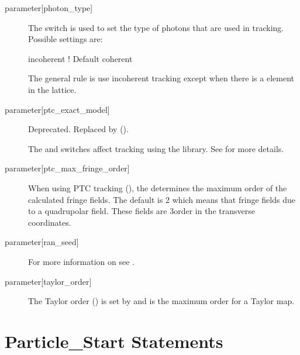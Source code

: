 \begin{description}
%
  \item[{parameter[photon_type]}] \Newline
The  switch is used to set the type of photons that are used in tracking. Possible
settings are:
\begin{example}
  incoherent    ! Default
  coherent 
\end{example}
The general rule is use incoherent tracking except when there is a  element in
the lattice.
%
  \item[{parameter[ptc_exact_model]}] \Newline
Deprecated. Replaced by  ().

The  and  switches affect tracking using the 
library. See  for more details.
%
  \item[{parameter[ptc_max_fringe_order]}] \Newline
When using PTC tracking (), the  determines
the maximum order of the calculated fringe fields. The default is 2 which means that fringe fields
due to a quadrupolar field. These fields are 3\Rd order in the transverse coordinates.
%
  \item[{parameter[ran_seed]}] \Newline
For more information on  see .
%
  \item[{parameter[taylor_order]}] \Newline
The Taylor order () is set by  and is the maximum
order for a Taylor map.
  \end{description}

\section{Particle_Start Statements} 
\label{s:beam.start}

